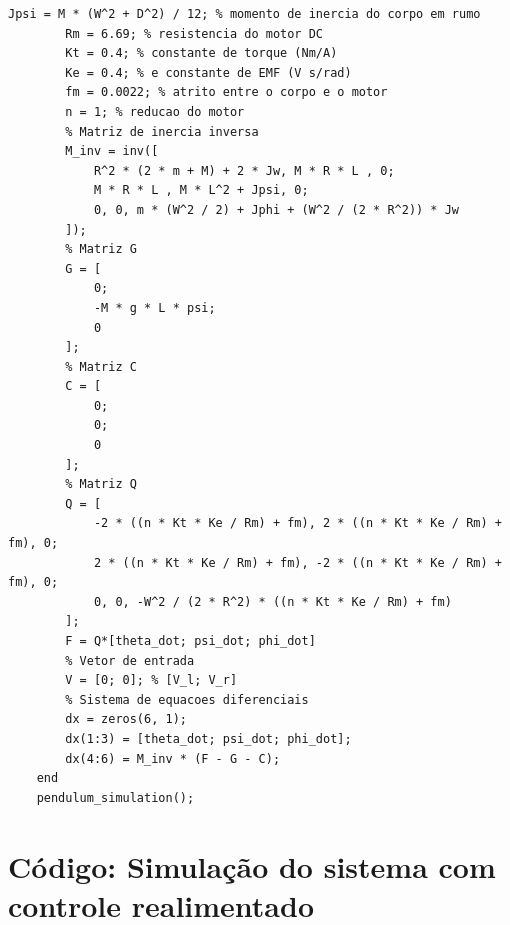 \documentclass[10pt]{article}
\begin{document}
\begin{appendices}
\begin{lstlisting}[caption={Código da simulação do sistema com ode45}, label=lst:pendulum_sim_l]
        Jpsi = M * (W^2 + D^2) / 12; % momento de inercia do corpo em rumo
        Rm = 6.69; % resistencia do motor DC
        Kt = 0.4; % constante de torque (Nm/A)
        Ke = 0.4; % e constante de EMF (V s/rad)
        fm = 0.0022; % atrito entre o corpo e o motor
        n = 1; % reducao do motor
        % Matriz de inercia inversa
        M_inv = inv([
            R^2 * (2 * m + M) + 2 * Jw, M * R * L , 0;
            M * R * L , M * L^2 + Jpsi, 0;
            0, 0, m * (W^2 / 2) + Jphi + (W^2 / (2 * R^2)) * Jw
        ]);
        % Matriz G
        G = [
            0;
            -M * g * L * psi;
            0
        ];
        % Matriz C
        C = [
            0;
            0;
            0
        ];
        % Matriz Q
        Q = [
            -2 * ((n * Kt * Ke / Rm) + fm), 2 * ((n * Kt * Ke / Rm) + fm), 0;
            2 * ((n * Kt * Ke / Rm) + fm), -2 * ((n * Kt * Ke / Rm) + fm), 0;
            0, 0, -W^2 / (2 * R^2) * ((n * Kt * Ke / Rm) + fm)
        ];
        F = Q*[theta_dot; psi_dot; phi_dot]
        % Vetor de entrada
        V = [0; 0]; % [V_l; V_r]
        % Sistema de equacoes diferenciais
        dx = zeros(6, 1);
        dx(1:3) = [theta_dot; psi_dot; phi_dot];
        dx(4:6) = M_inv * (F - G - C);
    end
    pendulum_simulation();
\end{lstlisting}

\section{Código: Simulação do sistema com controle realimentado}


\end{appendices}
\end{document}
